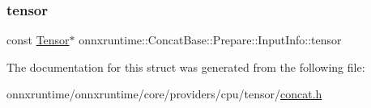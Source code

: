 \mbox{\label{structonnxruntime_1_1ConcatBase_1_1Prepare_1_1InputInfo_abdad6af912bc7a1c6eea59c1e720e24f}} 
\subsubsection{\texorpdfstring{tensor}{tensor}}
{\footnotesize\ttfamily const \mbox{\hyperlink{classonnxruntime_1_1Tensor}{Tensor}}$\ast$ onnxruntime\+::\+Concat\+Base\+::\+Prepare\+::\+Input\+Info\+::tensor}



The documentation for this struct was generated from the following file\+:\begin{DoxyCompactItemize}
\item 
onnxruntime/onnxruntime/core/providers/cpu/tensor/\mbox{\hyperlink{cpu_2tensor_2concat_8h}{concat.\+h}}\end{DoxyCompactItemize}
